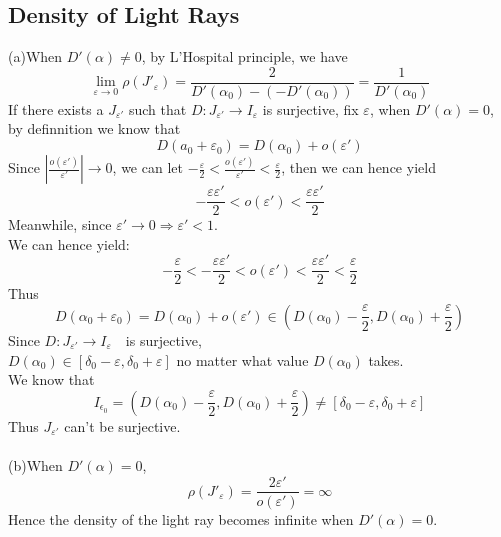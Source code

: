 \documentclass{article}
\begin{document}
\begin{spacing}{1.5}
\subsection{Density of Light Rays}
(a)When $D'(\alpha)\neq 0$, by L'Hospital principle, we have
$$\underset{\varepsilon\rightarrow 0}{\lim}\rho(J'_{\varepsilon})=\frac{2}{D'(\alpha_0)-(-D'(\alpha_0))}=\frac{1}{D'(\alpha_0)}$$
If there exists a $J_{\varepsilon '}$ such that $D:J_{\varepsilon '}\rightarrow I_{\varepsilon}$ is surjective, fix $\varepsilon$, when $D'(\alpha)=0$, by definnition we know that 
$$D(a_0+\varepsilon_0)=D(\alpha_0)+o(\varepsilon')$$
Since $|\frac{o(\varepsilon ')}{\varepsilon '}|\rightarrow 0$, we can let $-\frac{\varepsilon}{2}<\frac{o(\varepsilon ')}{\varepsilon '}<\frac{\varepsilon}{2}$, then we can hence yield 
$$-\frac{\varepsilon\varepsilon '}{2}<o(\varepsilon ')<\frac{\varepsilon\varepsilon '}{2}$$
Meanwhile, since $\varepsilon'\rightarrow 0\Rightarrow \varepsilon '<1$.\\
We can hence yield:
$$-\frac{\varepsilon}{2}<-\frac{\varepsilon\varepsilon '}{2}<o(\varepsilon ')<\frac{\varepsilon\varepsilon '}{2}<\frac{\varepsilon}{2}$$
Thus $$D(\alpha_0+\varepsilon_0)=D(\alpha_0)+o(\varepsilon ')\in(D(\alpha_0)-\frac{\varepsilon}{2},D(\alpha_0)+\frac{\varepsilon}{2})$$
Since $D:J_{\varepsilon '}\rightarrow I_{\varepsilon}$　is surjective,\\
$D(\alpha_0)\in[\delta_0-\varepsilon,\delta_0+\varepsilon]$ no matter what value $D(\alpha_0)$ takes.\\
We know that
$$I_{\epsilon_0}=(D(\alpha_0)-\frac{\varepsilon}{2},D(\alpha_0)+\frac{\varepsilon}{2})\neq[\delta_0-\varepsilon,\delta_0+\varepsilon]$$
Thus $J_{\varepsilon '}$ can't be surjective.\\
\\
(b)When $D'(\alpha)=0$, $$\rho(J'_{\varepsilon})=\frac{2\varepsilon '}{o(\varepsilon ')}=\infty$$
Hence the density of the light ray becomes infinite when $D'(\alpha)=0$.


\end{spacing}
\end{document}
